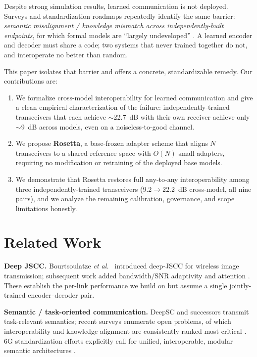 \documentclass[11pt]{article}
\begin{document}
Despite strong simulation results, learned communication is not deployed. Surveys and
standardization roadmaps repeatedly identify the same barrier: \emph{semantic
misalignment / knowledge mismatch across independently-built endpoints}, for which
formal models are ``largely undeveloped'' \cite{tenchallenges,roadmap2025}. A learned
encoder and decoder must share a code; two systems that never trained together do not,
and interoperate no better than random.

This paper isolates that barrier and offers a concrete, standardizable remedy. Our
contributions are:
\begin{enumerate}
  \item We formalize cross-model interoperability for learned communication and give a
        clean empirical characterization of the failure: independently-trained
        transceivers that each achieve $\sim$22.7~dB with their own receiver achieve
        only $\sim$9~dB across models, even on a noiseless-to-good channel.
  \item We propose \textbf{Rosetta}, a base-frozen adapter scheme that aligns
        $N$ transceivers to a shared reference space with $O(N)$ small adapters,
        requiring no modification or retraining of the deployed base models.
  \item We demonstrate that Rosetta restores full any-to-any interoperability among
        three independently-trained transceivers ($9.2 \rightarrow 22.2$~dB
        cross-model, all nine pairs), and we analyze the remaining calibration,
        governance, and scope limitations honestly.
\end{enumerate}

\section{Related Work}
\textbf{Deep JSCC.} Bourtsoulatze \emph{et al.}~\cite{bourtsoulatze2019} introduced
deep-JSCC for wireless image transmission; subsequent work added bandwidth/SNR
adaptivity and attention \cite{kurka2020}. These establish the per-link performance we
build on but assume a single jointly-trained encoder--decoder pair.

\textbf{Semantic / task-oriented communication.} DeepSC and successors
\cite{xie2021,gunduz2023} transmit task-relevant semantics; recent surveys enumerate
open problems, of which interoperability and knowledge alignment are consistently
ranked most critical \cite{tenchallenges}. 6G standardization efforts explicitly call
for unified, interoperable, modular semantic architectures \cite{roadmap2025}.
\end{document}
